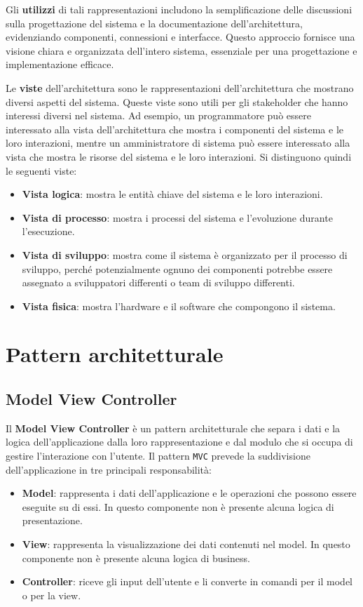 Gli \textbf{utilizzi} di tali rappresentazioni includono la semplificazione delle discussioni sulla
progettazione del sistema e la documentazione dell'architettura, evidenziando componenti,
connessioni e interfacce. Questo approccio fornisce una visione chiara e organizzata
dell'intero sistema, essenziale per una progettazione e implementazione efficace.

Le \textbf{viste} dell'architettura sono le rappresentazioni dell'architettura che mostrano
diversi aspetti del sistema. Queste viste sono utili per gli stakeholder che hanno
interessi diversi nel sistema. Ad esempio, un programmatore può essere interessato
alla vista dell'architettura che mostra i componenti del sistema e le loro interazioni,
mentre un amministratore di sistema può essere interessato alla vista che mostra
le risorse del sistema e le loro interazioni.
Si distinguono quindi le seguenti viste:
\begin{itemize}
  \item \textbf{Vista logica}: mostra le entità chiave del sistema e le loro interazioni.
  \item \textbf{Vista di processo}: mostra i processi del sistema e l'evoluzione durante l'esecuzione.
  \item \textbf{Vista di sviluppo}: mostra come il sistema è organizzato per il processo di sviluppo, 
  perché potenzialmente ognuno dei componenti potrebbe essere assegnato a sviluppatori differenti o 
  team di sviluppo differenti.
  \item \textbf{Vista fisica}: mostra l'hardware e il software che compongono il sistema.
\end{itemize}

\section{Pattern architetturale}

\subsection{Model View Controller}
Il \textbf{Model View Controller} è un pattern architetturale che separa i dati e la logica
dell'applicazione dalla loro rappresentazione e dal modulo che si occupa di gestire 
l'interazione con l'utente. Il pattern \texttt{MVC} prevede la suddivisione dell'applicazione
in tre principali responsabilità:
\begin{itemize}
  \item \textbf{Model}: rappresenta i dati dell'applicazione e le operazioni che possono essere
  eseguite su di essi. In questo componente non è presente alcuna logica di presentazione.
  \item \textbf{View}: rappresenta la visualizzazione dei dati contenuti nel model. In questo
  componente non è presente alcuna logica di business.
  \item \textbf{Controller}: riceve gli input dell'utente e li converte in comandi per il model
  o per la view.
\end{itemize}

